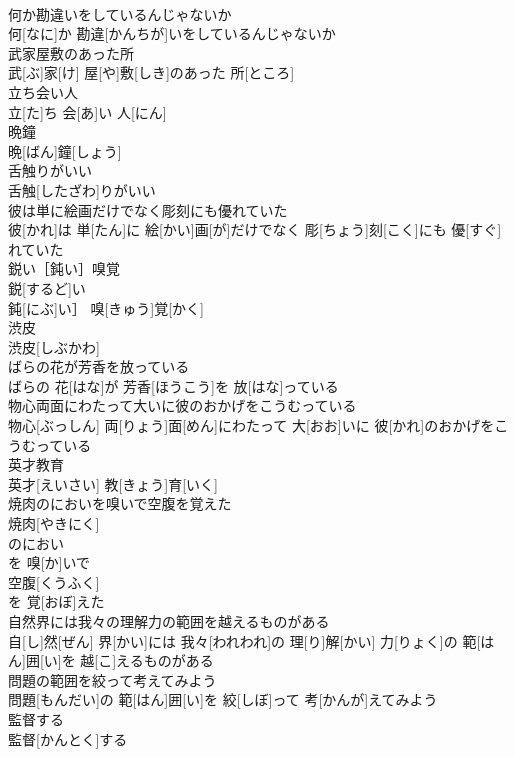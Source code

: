\documentclass[8pt]{extreport}
\begin{document}
\begin{CJK}{UTF8}{min}
\\	何か勘違いをしているんじゃないか	
\\	何[なに]か 勘違[かんちが]いをしているんじゃないか
\\	武家屋敷のあった所	
\\	武[ぶ]家[け] 屋[や]敷[しき]のあった 所[ところ]
\\	立ち会い人	
\\	立[た]ち 会[あ]い 人[にん]
\\	晩鐘	
\\	晩[ばん]鐘[しょう]
\\	舌触りがいい	
\\	舌触[したざわ]りがいい
\\	彼は単に絵画だけでなく彫刻にも優れていた	
\\	彼[かれ]は 単[たん]に 絵[かい]画[が]だけでなく 彫[ちょう]刻[こく]にも 優[すぐ]れていた
\\	鋭い［鈍い］嗅覚	
\\	鋭[するど]い
\\	鈍[にぶ]い］ 嗅[きゅう]覚[かく]
\\	渋皮	
\\	渋皮[しぶかわ]
\\	ばらの花が芳香を放っている	
\\	ばらの 花[はな]が 芳香[ほうこう]を 放[はな]っている
\\	物心両面にわたって大いに彼のおかげをこうむっている	
\\	物心[ぶっしん] 両[りょう]面[めん]にわたって 大[おお]いに 彼[かれ]のおかげをこうむっている
\\	英才教育	
\\	英才[えいさい] 教[きょう]育[いく]
\\	焼肉のにおいを嗅いで空腹を覚えた	
\\	焼肉[やきにく]
\\	のにおい 
\\	を 嗅[か]いで 
\\	空腹[くうふく]
\\	を 覚[おぼ]えた 
\\	自然界には我々の理解力の範囲を越えるものがある	
\\	自[し]然[ぜん] 界[かい]には 我々[われわれ]の 理[り]解[かい] 力[りょく]の 範[はん]囲[い]を 越[こ]えるものがある
\\	問題の範囲を絞って考えてみよう	
\\	問題[もんだい]の 範[はん]囲[い]を 絞[しぼ]って 考[かんが]えてみよう
\\	監督する	
\\	監督[かんとく]する

\end{CJK}
\end{document}
